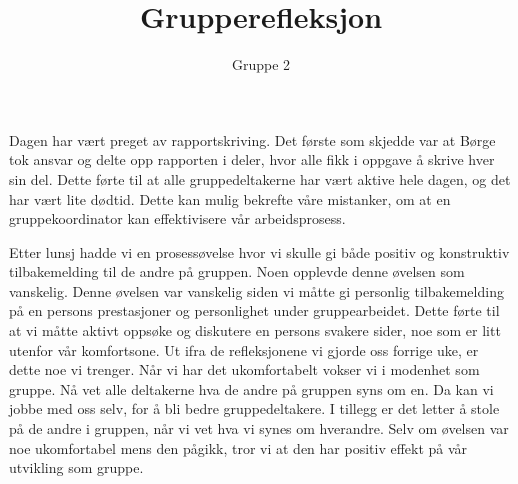 \documentclass[10pt,a4paper]{article}
\title{Grupperefleksjon}
\author{Gruppe 2}
\begin{document}
\maketitle

Dagen har vært preget av rapportskriving. Det første som skjedde var at Børge tok ansvar og delte opp rapporten i deler, hvor alle fikk i oppgave å skrive hver sin del. Dette førte til at alle gruppedeltakerne har vært aktive hele dagen, og det har vært lite dødtid. Dette kan mulig bekrefte våre mistanker, om at en gruppekoordinator kan effektivisere vår arbeidsprosess.  

Etter lunsj hadde vi en prosessøvelse hvor vi skulle gi både positiv og konstruktiv tilbakemelding til de andre på gruppen. Noen opplevde denne øvelsen som vanskelig. Denne øvelsen var vanskelig siden vi måtte gi personlig tilbakemelding på en persons prestasjoner og personlighet under gruppearbeidet. Dette førte til at vi måtte aktivt oppsøke og diskutere en persons svakere sider, noe som er litt utenfor vår komfortsone. Ut ifra de refleksjonene vi gjorde oss forrige uke, er dette noe vi trenger. Når vi har det ukomfortabelt vokser vi i modenhet som gruppe. Nå vet alle deltakerne hva de andre på gruppen syns om en. Da kan vi jobbe med oss selv, for å bli bedre gruppedeltakere. I tillegg er det letter å stole på de andre i gruppen, når vi vet hva vi synes om hverandre. Selv om øvelsen var noe ukomfortabel mens den pågikk, tror vi at den har positiv effekt på vår utvikling som gruppe.       
\end{document}
